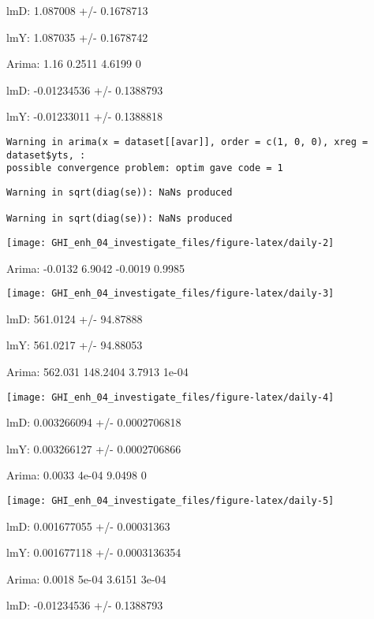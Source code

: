 \documentclass[
  10pt,
  a4paper,oneside]{article}
\begin{document}
lmD: 1.087008 +/- 0.1678713

lmY: 1.087035 +/- 0.1678742

Arima: 1.16 0.2511 4.6199 0

lmD: -0.01234536 +/- 0.1388793

lmY: -0.01233011 +/- 0.1388818

\begin{verbatim}
Warning in arima(x = dataset[[avar]], order = c(1, 0, 0), xreg = dataset$yts, :
possible convergence problem: optim gave code = 1
\end{verbatim}

\begin{verbatim}
Warning in sqrt(diag(se)): NaNs produced

Warning in sqrt(diag(se)): NaNs produced
\end{verbatim}

\begin{center}\texttt{[image: GHI\_enh\_04\_investigate\_files/figure-latex/daily-2]} \end{center}

Arima: -0.0132 6.9042 -0.0019 0.9985

\begin{center}\texttt{[image: GHI\_enh\_04\_investigate\_files/figure-latex/daily-3]} \end{center}

lmD: 561.0124 +/- 94.87888

lmY: 561.0217 +/- 94.88053

Arima: 562.031 148.2404 3.7913 1e-04

\begin{center}\texttt{[image: GHI\_enh\_04\_investigate\_files/figure-latex/daily-4]} \end{center}

lmD: 0.003266094 +/- 0.0002706818

lmY: 0.003266127 +/- 0.0002706866

Arima: 0.0033 4e-04 9.0498 0

\begin{center}\texttt{[image: GHI\_enh\_04\_investigate\_files/figure-latex/daily-5]} \end{center}

lmD: 0.001677055 +/- 0.00031363

lmY: 0.001677118 +/- 0.0003136354

Arima: 0.0018 5e-04 3.6151 3e-04

lmD: -0.01234536 +/- 0.1388793
\end{document}
